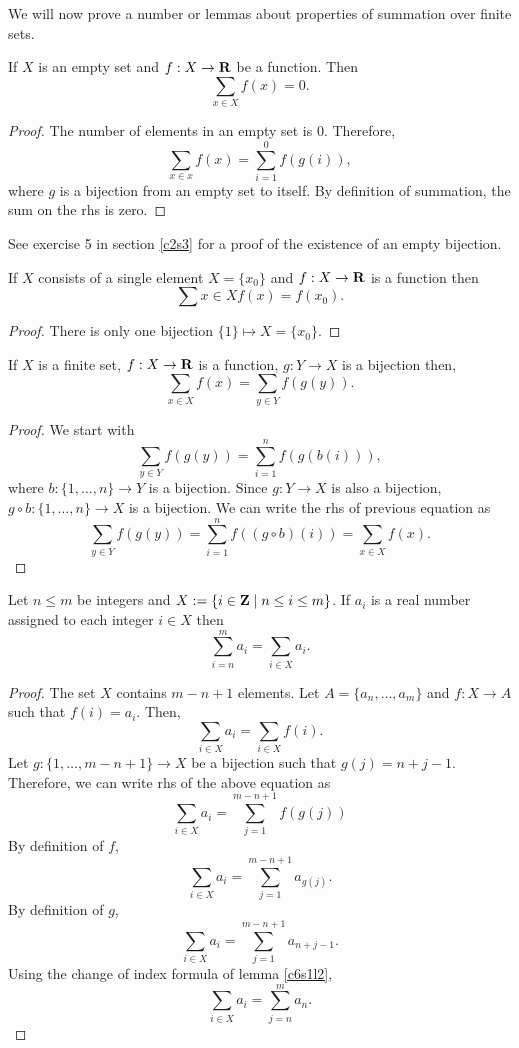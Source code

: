 We will now prove a number or lemmas about properties of summation over
finite sets.
\begin{lem}\label{c6s1l7}
If $X$ is an empty set and $f: X \rightarrow \mathbf{R}$ be a function. Then
\[
\sum_{x \in X}f(x) = 0.
\]
\end{lem}
\begin{proof}
The number of elements in an empty set is $0$. Therefore,
\[
\sum_{x \in x}f(x) = \sum_{i=1}^0f(g(i)),
\]
where $g$ is a bijection from an empty set to itself. By definition of
summation, the sum on the rhs is zero.
\end{proof}
\begin{rem}
See exercise 5 in section \ref{c2s3} for a proof of the existence of an
empty bijection.
\end{rem}

\begin{lem}\label{c6s1l8}
If $X$ consists of a single element $X = \{x_0\}$ and $f:X \rightarrow \mathbf{R}$
is a function then
\[
\sum{x \in X}f(x) = f(x_0).
\]
\end{lem}
\begin{proof}
There is only one bijection $\{1\} \mapsto X = \{x_0\}$.
\end{proof}

\begin{lem}\label{c6s1l9}
If $X$ is a finite set, $f: X \rightarrow \mathbf{R}$ is a function, $g: Y 
\rightarrow X$ is a bijection then,
\[
\sum_{x \in X}f(x) = \sum_{y \in Y}f(g(y)).
\]
\end{lem}
\begin{proof}
We start with
\[
\sum_{y \in Y}f(g(y)) = \sum_{i=1}^n f(g(b(i))),
\]
where $b: \{1, \ldots, n\} \rightarrow Y$ is a bijection. Since $g: Y
\rightarrow X$ is also a bijection, $g \circ b: \{1, \ldots, n\} \rightarrow
X$ is a bijection. We can write the rhs of previous equation as
\[
\sum_{y \in Y}f(g(y)) = \sum_{i=1}^n f((g \circ b)(i)) = \sum_{x \in X}f(x).
\]
\end{proof}

\begin{lem}\label{c6s1l10}
Let $n \le m$ be integers and $X := \{i \in \mathbf{Z} \;|\; n \le i \le m\}$. If
$a_i$ is a real number assigned to each integer $i \in X$ then
\[
\sum_{i=n}^m a_i = \sum_{i \in X}a_i.
\]
\end{lem}
\begin{proof}
The set $X$ contains $m - n + 1$ elements. Let $A = \{a_n, \ldots, a_m\}$
and $f: X \rightarrow A$ such that $f(i) = a_i$. Then,
\[
\sum_{i \in X}a_i = \sum_{i \in X}f(i).
\]
Let $g:\{1, \ldots, m - n + 1\} \rightarrow X$ be a bijection such that
$g(j) = n + j - 1$. Therefore, we can write rhs of the above equation as
\[
\sum_{i \in X}a_i = \sum_{j=1}^{m-n+1}f(g(j))
\]
By definition of $f$,
\[
\sum_{i \in X}a_i = \sum_{j=1}^{m-n+1}a_{g(j)}.
\]
By definition of $g$,
\[
\sum_{i \in X}a_i = \sum_{j=1}^{m-n+1}a_{n + j - 1}.
\]
Using the change of index formula of lemma \ref{c6s1l2},
\[
\sum_{i \in X}a_i = \sum_{j=n}^ma_n.
\]
\end{proof}

